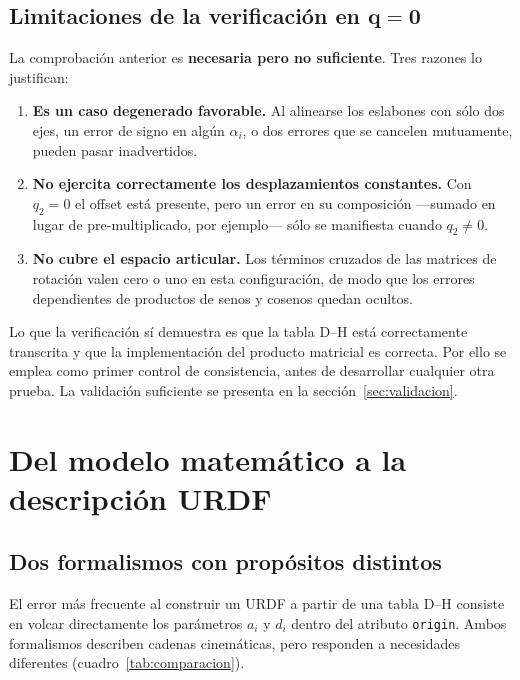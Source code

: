 \documentclass[11pt,a4paper]{article}
\newcommand{\mat}[1]{\mathbf{#1}}
\begin{document}
\subsection{Limitaciones de la verificación en \texorpdfstring{$\mat{q}=\mat{0}$}{q=0}}

La comprobación anterior es \textbf{necesaria pero no suficiente}. Tres
razones lo justifican:

\begin{enumerate}[leftmargin=*]
\item \textbf{Es un caso degenerado favorable.} Al alinearse los
eslabones con sólo dos ejes, un error de signo en algún $\alpha_i$, o
dos errores que se cancelen mutuamente, pueden pasar inadvertidos.
\item \textbf{No ejercita correctamente los desplazamientos
constantes.} Con $q_2 = 0$ el offset está presente, pero un error en su
composición —sumado en lugar de pre-multiplicado, por ejemplo— sólo se
manifiesta cuando $q_2 \neq 0$.
\item \textbf{No cubre el espacio articular.} Los términos cruzados de
las matrices de rotación valen cero o uno en esta configuración, de modo
que los errores dependientes de productos de senos y cosenos quedan
ocultos.
\end{enumerate}

Lo que la verificación sí demuestra es que la tabla D--H está
correctamente transcrita y que la implementación del producto matricial
es correcta. Por ello se emplea como primer control de consistencia,
antes de desarrollar cualquier otra prueba. La validación suficiente se
presenta en la sección~\ref{sec:validacion}.

\section{Del modelo matemático a la descripción URDF}

\subsection{Dos formalismos con propósitos distintos}

El error más frecuente al construir un URDF a partir de una tabla D--H
consiste en volcar directamente los parámetros $a_i$ y $d_i$ dentro del
atributo \texttt{origin}. Ambos formalismos describen cadenas
cinemáticas, pero responden a necesidades diferentes
(cuadro~\ref{tab:comparacion}).
\end{document}
